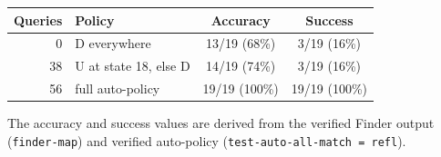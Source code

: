 \begin{center}
\small
\begin{tabular}{@{}rlcc@{}}
\textbf{Queries} & \textbf{Policy} & \textbf{Accuracy} & \textbf{Success} \\
\hline
0  & D everywhere           & 13/19 (68\%) & 3/19 (16\%) \\
38 & U at state 18, else D  & 14/19 (74\%) & 3/19 (16\%) \\
56 & full auto-policy       & 19/19 (100\%) & 19/19 (100\%) \\
\end{tabular}
\end{center}

\noindent The accuracy and success values are derived from the verified Finder output (\texttt{finder-map}) and verified auto-policy (\texttt{test-auto-all-match = refl}).

